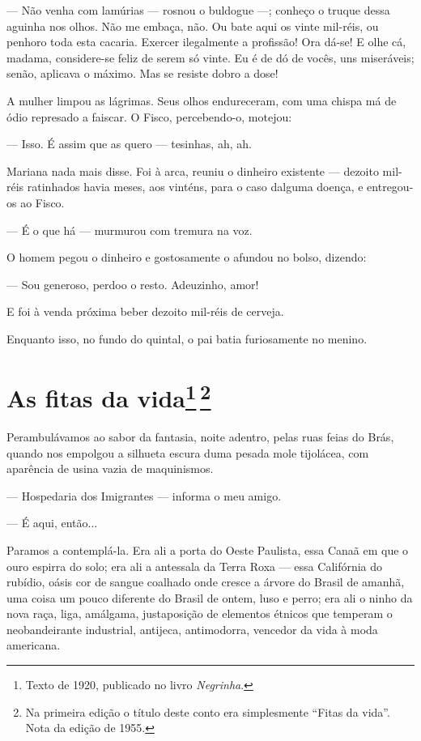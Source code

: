 --- Não venha com lamúrias --- rosnou o buldogue ---; conheço o truque
dessa aguinha nos olhos. Não me embaça, não. Ou bate aqui os vinte
mil-réis, ou penhoro toda esta cacaria. Exercer ilegalmente a profissão!
Ora dá-se! E olhe cá, madama, considere-se feliz de serem só vinte. Eu é
de dó de vocês, uns miseráveis; senão, aplicava o máximo. Mas se resiste
dobro a dose!

A mulher limpou as lágrimas. Seus olhos endureceram, com uma chispa má
de ódio represado a faiscar. O Fisco, percebendo-o, motejou:

--- Isso. É assim que as quero --- tesinhas, ah, ah.

Mariana nada mais disse. Foi à arca, reuniu o dinheiro existente ---
dezoito mil-réis ratinhados havia meses, aos vinténs, para o caso
dalguma doença, e entregou-os ao Fisco.

--- É o que há --- murmurou com tremura na voz.

O homem pegou o dinheiro e gostosamente o afundou no bolso, dizendo:

--- Sou generoso, perdoo o resto. Adeuzinho, amor!

E foi à venda próxima beber dezoito mil-réis de cerveja.

Enquanto isso, no fundo do quintal, o pai batia furiosamente no menino.

\chapter{As fitas da vida\footnote[*]{Texto de 1920, publicado no livro \emph{Negrinha}.}\,\footnote[**]{Na primeira   edição o título deste conto era simplesmente ``Fitas da vida''. Nota da edição de 1955.}}

Perambulávamos ao sabor da fantasia, noite adentro, pelas ruas feias do
Brás, quando nos empolgou a silhueta escura duma pesada mole tijolácea,
com aparência de usina vazia de maquinismos.

--- Hospedaria dos Imigrantes --- informa o meu amigo.

--- É aqui, então...

Paramos a contemplá-la. Era ali a porta do Oeste Paulista, essa Canaã em
que o ouro espirra do solo; era ali a antessala da Terra Roxa --- essa
Califórnia do rubídio, oásis cor de sangue coalhado onde cresce a árvore
do Brasil de amanhã, uma coisa um pouco diferente do Brasil de ontem,
luso e perro; era ali o ninho da nova raça, liga, amálgama, justaposição
de elementos étnicos que temperam o neobandeirante industrial, antijeca,
antimodorra, vencedor da vida à moda americana.

